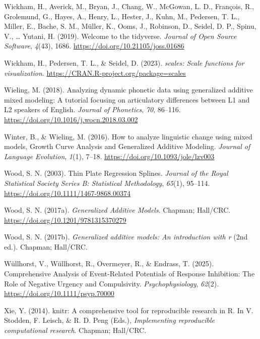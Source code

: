 \documentclass[
  doc,
  floatsintext,
  longtable,
  a4paper,
  nolmodern,
  notxfonts,
  notimes,
  colorlinks=true,linkcolor=blue,citecolor=blue,urlcolor=blue]{apa7}
\newlength{\cslhangindent}
\newenvironment{CSLReferences}[2] %
 {\begin{list}{}{%
  \setlength{\itemindent}{0pt}
  \setlength{\leftmargin}{0pt}
  \setlength{\parsep}{0pt}
  \ifodd #1
   \setlength{\leftmargin}{\cslhangindent}
   \setlength{\itemindent}{-1\cslhangindent}
  \fi
  \setlength{\itemsep}{#2\baselineskip}}}
 {\end{list}}
\begin{document}
\begin{CSLReferences}{1}{0}
Wickham, H., Averick, M., Bryan, J., Chang, W., McGowan, L. D.,
François, R., Grolemund, G., Hayes, A., Henry, L., Hester, J., Kuhn, M.,
Pedersen, T. L., Miller, E., Bache, S. M., Müller, K., Ooms, J.,
Robinson, D., Seidel, D. P., Spinu, V., \ldots{} Yutani, H. (2019).
Welcome to the {tidyverse}. \emph{Journal of Open Source Software},
\emph{4}(43), 1686. \url{https://doi.org/10.21105/joss.01686}

Wickham, H., Pedersen, T. L., \& Seidel, D. (2023). \emph{{scales}:
Scale functions for visualization}.
\url{https://CRAN.R-project.org/package=scales}

Wieling, M. (2018). Analyzing dynamic phonetic data using generalized
additive mixed modeling: A tutorial focusing on articulatory differences
between L1 and L2 speakers of English. \emph{Journal of Phonetics},
\emph{70}, 86--116. \url{https://doi.org/10.1016/j.wocn.2018.03.002}

Winter, B., \& Wieling, M. (2016). How to analyze linguistic change
using mixed models, Growth Curve Analysis and Generalized Additive
Modeling. \emph{Journal of Language Evolution}, \emph{1}(1), 7--18.
\url{https://doi.org/10.1093/jole/lzv003}

Wood, S. N. (2003). Thin Plate Regression Splines. \emph{Journal of the
Royal Statistical Society Series B: Statistical Methodology},
\emph{65}(1), 95--114. \url{https://doi.org/10.1111/1467-9868.00374}

Wood, S. N. (2017a). \emph{Generalized Additive Models}. Chapman;
Hall/CRC. \url{https://doi.org/10.1201/9781315370279}

Wood, S. N. (2017b). \emph{Generalized additive models: An introduction
with r} (2nd ed.). Chapman; Hall/CRC.

Wüllhorst, V., Wüllhorst, R., Overmeyer, R., \& Endrass, T. (2025).
Comprehensive Analysis of Event{-}Related Potentials of Response
Inhibition: The Role of Negative Urgency and Compulsivity.
\emph{Psychophysiology}, \emph{62}(2).
\url{https://doi.org/10.1111/psyp.70000}

Xie, Y. (2014). {knitr}: A comprehensive tool for reproducible research
in {R}. In V. Stodden, F. Leisch, \& R. D. Peng (Eds.),
\emph{Implementing reproducible computational research}. Chapman;
Hall/CRC.


\end{CSLReferences}
\end{document}
